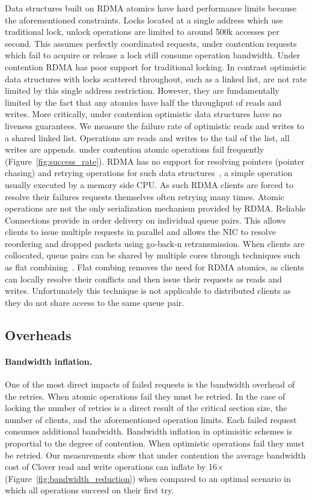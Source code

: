 Data structures built on RDMA atomics have hard performance
limits because the aforementioned constraints.  Locks
located at a single address which use traditional lock,
unlock operations are limited to around 500k accesses per
second. This assumes perfectly coordinated requests, under
contention requests which fail to acquire or release a lock
still consume operation bandwidth.
Under contention RDMA has poor support for traditional
locking. In contrast optimistic data structures with locks
scattered throughout, such as a linked list, are not rate
limited by this single address restriction.  However, they
are fundamentally limited by the fact that any atomics have
half the throughput of reads and writes. More critically,
under contention optimistic data structures have no liveness
guarantees. We measure the failure rate of optimistic reads
and writes to a shared linked list. Operations are reads and
writes to the tail of the list, all writes are appends.
under contention atomic operations fail frequently
(Figure~\ref{fig:success_rate}).  RDMA has no support for
resolving pointers (pointer chasing) and retrying operations
for such data structures~\cite{rma,snap,prism}, a simple
operation usually executed by a memory side CPU. As such
RDMA clients are forced to resolve their failures requests
themselves often retrying many times.
Atomic operations are not the only serialization mechanism
provided by RDMA. Reliable Connections provide in order
delivery on individual queue pairs. This allows clients to
issue multiple requests in parallel and allows the NIC to
resolve reordering and dropped packets using go-back-n
retransmission.  When clients are collocated, queue pairs
can be shared by multiple cores through techniques such as
flat combining~\cite{flock,sherman}. Flat combing removes
the need for RDMA atomics, as clients can locally resolve
their conflicts and then issue their requests as reads and
writes.  Unfortunately this technique is not applicable to
distributed clients as they do not share access to the same
queue pair.


\subsection{Overheads}

\paragraph{Bandwidth inflation.} 
One of the most direct impacts of failed requests is the
bandwidth overhead of the retries. When atomic operations
fail they must be retried.  In the case of locking the
number of retries is a direct result of the critical section
size, the number of clients, and the aforementioned
operation limits. Each failed request consumes additional
bandwidth. Bandwidth inflation in optimisitic schemes is
proportial to the degree of contention. When optimistic
operations fail they must be retried.
Our measurements show that under contention the average
bandwidth cost of Clover read and write operations can
inflate by 16$\times$ (Figure~\ref{fig:bandwidth_reduction})
when compared to an optimal scenario in which all operations
succeed on their first try.

